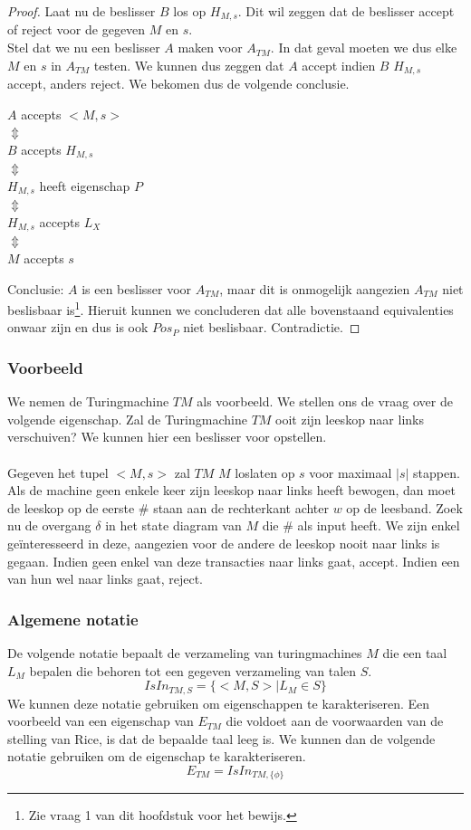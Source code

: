 \begin{proof}
	Laat nu de beslisser $B$ los op $H_{M,s}$. Dit wil zeggen dat de beslisser accept of reject voor de gegeven $M$ en $s$.\\
	Stel dat we nu een beslisser $A$ maken voor $A_{TM}$. In dat geval moeten we dus elke $M$ en $s$ in $A_{TM}$ testen. We kunnen dus zeggen dat $A$ accept indien $B$ $H_{M,s}$ accept, anders reject. We bekomen dus de volgende conclusie.
	\begin{center}
		$A$ accepts $<M,s>$\\
		$\Updownarrow$\\
		$B$ accepts $H_{M,s}$\\
		$\Updownarrow$\\
		$H_{M,s}$ heeft eigenschap $P$\\
		$\Updownarrow$\\
		$H_{M,s}$ accepts $L_X$\\
		$\Updownarrow$\\
		$M$ accepts $s$
	\end{center}
	Conclusie: $A$ is een beslisser voor $A_{TM}$, maar dit is onmogelijk aangezien $A_{TM}$ niet beslisbaar is\footnote{Zie vraag 1 van dit hoofdstuk voor het bewijs.}. Hieruit kunnen we concluderen dat alle bovenstaand equivalenties onwaar zijn en dus is  ook $Pos_P$ niet beslisbaar. Contradictie.
\end{proof}

\subsubsection*{Voorbeeld}

We nemen de Turingmachine $TM$ als voorbeeld. We stellen ons de vraag over de volgende eigenschap. Zal de Turingmachine $TM$ ooit zijn leeskop naar links verschuiven? We kunnen hier een beslisser voor opstellen.
\\\\
Gegeven het tupel $<M,s>$ zal $TM$ $M$ loslaten op $s$ voor maximaal $|s|$ stappen. Als de machine geen enkele keer zijn leeskop naar links heeft bewogen, dan moet de leeskop op de eerste $\#$ staan aan de rechterkant achter $w$ op de leesband. Zoek nu de overgang $\delta$ in het state diagram van $M$ die $\#$ als input heeft. We zijn enkel ge\"interesseerd in deze, aangezien voor de andere de leeskop nooit naar links is gegaan. Indien geen enkel van deze transacties naar links gaat, accept. Indien een van hun wel naar links gaat, reject.

\subsubsection*{Algemene notatie}

De volgende notatie bepaalt de verzameling van turingmachines $M$ die een taal $L_M$ bepalen die behoren tot een gegeven verzameling van talen $S$.
$$IsIn_{TM,S}=\{<M,S>|L_M \in S\}$$
We kunnen deze notatie gebruiken om eigenschappen te karakteriseren. Een voorbeeld van een eigenschap van $E_{TM}$ die voldoet aan de voorwaarden van de stelling van Rice, is dat de bepaalde taal leeg is. We kunnen dan de volgende notatie gebruiken om de eigenschap te karakteriseren.
$$E_{TM} = IsIn_{TM,\{\phi\}}$$
